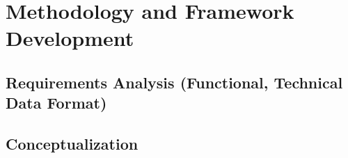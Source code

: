\chapter{Methodology and Framework Development}
\label{chap:methodology}

\section{Requirements Analysis (Functional, Technical Data Format)}

\section{Conceptualization}


\cite{waswani2017attention}